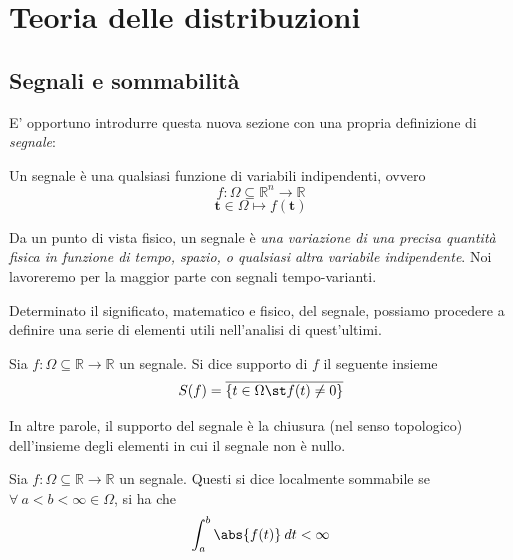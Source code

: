 
\section{Teoria delle distribuzioni}
    \subsection{Segnali e sommabilità}
        E' opportuno introdurre questa nuova sezione con una propria definizione di \textit{segnale}:

        \begin{definition}
            Un segnale è una qualsiasi funzione di variabili indipendenti, ovvero
            \[
                f: \Omega \subseteq \mathbb{R}^{n} \rightarrow \mathbb{R}
            \]
            \[
                \mathbf{t} \in \Omega \mapsto f(\mathbf{t})
            \]
        \end{definition}

        Da un punto di vista fisico, un segnale è \textit{una variazione di una precisa quantità fisica in funzione di tempo, spazio, o qualsiasi altra variabile indipendente}.
        Noi lavoreremo per la maggior parte con segnali tempo-varianti.

        Determinato il significato, matematico e fisico, del segnale, possiamo procedere a definire una serie di elementi utili nell'analisi di quest'ultimi.

        \begin{definition}
            Sia $f: \Omega \subseteq \mathbb{R} \rightarrow \mathbb{R}$ un segnale.
            Si dice supporto di $f$ il seguente insieme
            \[
                S(f) = \overline{\{t \in \Omega \st f(t) \neq 0\}}
            \]
        \end{definition}

        In altre parole, il supporto del segnale è la chiusura (nel senso topologico) dell'insieme degli elementi in cui il segnale non è nullo.

        \begin{definition}
            Sia $f: \Omega \subseteq \mathbb{R} \rightarrow \mathbb{R}$ un segnale.
            Questi si dice localmente sommabile se $\forall \: a < b < \infty \in \Omega$, si ha che
            \[
                \int_{a}^{b} \abs{f(t)} \: dt < \infty
            \]
        \end{definition}

